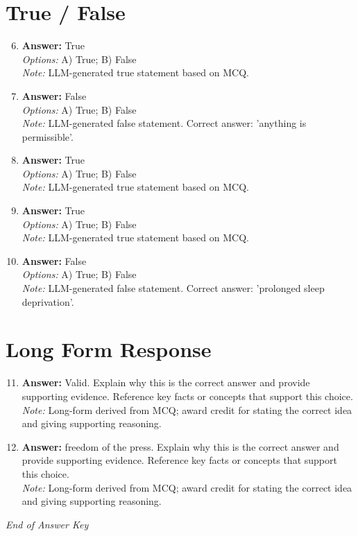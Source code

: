 \documentclass[12pt]{article}
\begin{document}
\section*{True / False}
\begin{enumerate}[label=\arabic*.]
\setcounter{enumi}{5}
\item \textbf{Answer:} True
\\ \textit{Options:} A) True; B) False
\\ \textit{Note:} LLM-generated true statement based on MCQ.
\item \textbf{Answer:} False
\\ \textit{Options:} A) True; B) False
\\ \textit{Note:} LLM-generated false statement. Correct answer: 'anything is permissible'.
\item \textbf{Answer:} True
\\ \textit{Options:} A) True; B) False
\\ \textit{Note:} LLM-generated true statement based on MCQ.
\item \textbf{Answer:} True
\\ \textit{Options:} A) True; B) False
\\ \textit{Note:} LLM-generated true statement based on MCQ.
\item \textbf{Answer:} False
\\ \textit{Options:} A) True; B) False
\\ \textit{Note:} LLM-generated false statement. Correct answer: 'prolonged sleep deprivation'.
\end{enumerate}

\section*{Long Form Response}
\begin{enumerate}[label=\arabic*.]
\setcounter{enumi}{10}
\item \textbf{Answer:} Valid. Explain why this is the correct answer and provide supporting evidence. Reference key facts or concepts that support this choice.
\\ \textit{Note:} Long-form derived from MCQ; award credit for stating the correct idea and giving supporting reasoning.
\item \textbf{Answer:} freedom of the press. Explain why this is the correct answer and provide supporting evidence. Reference key facts or concepts that support this choice.
\\ \textit{Note:} Long-form derived from MCQ; award credit for stating the correct idea and giving supporting reasoning.
\end{enumerate}

\vfill
\noindent\textit{End of Answer Key}
\end{document}
